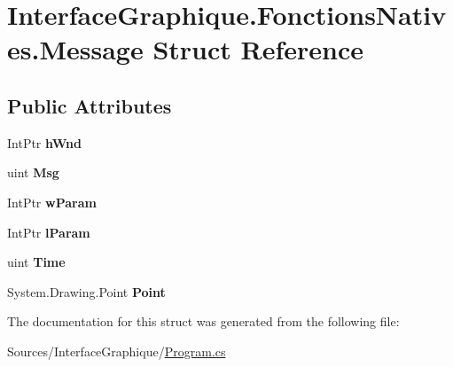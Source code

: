 \hypertarget{struct_interface_graphique_1_1_fonctions_natives_1_1_message}{}\section{Interface\+Graphique.\+Fonctions\+Natives.\+Message Struct Reference}
\label{struct_interface_graphique_1_1_fonctions_natives_1_1_message}
\subsection*{Public Attributes}
\begin{DoxyCompactItemize}
\item 
Int\+Ptr {\bfseries h\+Wnd}
\item 
uint {\bfseries Msg}
\item 
Int\+Ptr {\bfseries w\+Param}
\item 
Int\+Ptr {\bfseries l\+Param}
\item 
uint {\bfseries Time}
\item 
System.\+Drawing.\+Point {\bfseries Point}
\end{DoxyCompactItemize}


The documentation for this struct was generated from the following file\+:\begin{DoxyCompactItemize}
\item 
Sources/\+Interface\+Graphique/\hyperlink{_program_8cs}{Program.\+cs}\end{DoxyCompactItemize}
